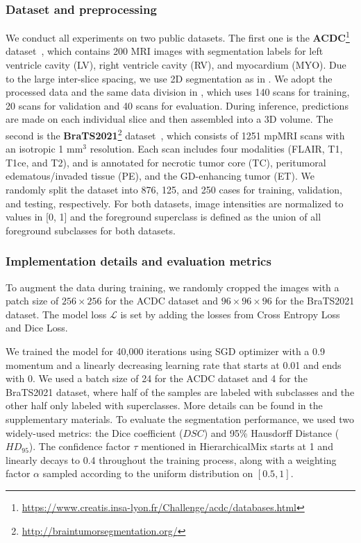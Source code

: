 \documentclass[runningheads]{llncs}
\begin{document}
\subsubsection{Dataset and preprocessing}
We conduct all experiments on two public datasets. The first one is the \textbf{ACDC}\footnote{\href{https://www.creatis.insa-lyon.fr/Challenge/acdc/databases.html}{https://www.creatis.insa-lyon.fr/Challenge/acdc/databases.html}} dataset~\cite{bernard2018deep}, which contains 200 MRI images with segmentation labels for left ventricle cavity (LV), right ventricle cavity (RV), and myocardium (MYO). Due to the large inter-slice spacing, we use 2D segmentation as in \cite{bai2017semi}. We adopt the processed data and the same data division in \cite{ssl4mis2020}, which uses 140 scans for training, 20 scans for validation and 40 scans for evaluation. During inference, predictions are made on each individual slice and then assembled into a 3D volume. The second is the \textbf{BraTS2021}\footnote{\href{http://braintumorsegmentation.org/}{http://braintumorsegmentation.org/}} dataset~\cite{baid2021rsna}, which consists of 1251 mpMRI scans with an isotropic 1 mm$^3$ resolution. Each scan includes four modalities (FLAIR, T1, T1ce, and T2), and is annotated for necrotic tumor core (TC), peritumoral edematous/invaded tissue (PE), and the GD-enhancing tumor (ET). We randomly split the dataset into 876, 125, and 250 cases for training, validation, and testing, respectively. For both datasets, image intensities are normalized to values in [0, 1] and the foreground superclass is defined as the union of all foreground subclasses for both datasets.

\subsubsection{Implementation details and evaluation metrics}
To augment the data during training, we randomly cropped the images with a patch size of $256 \times 256$ for the ACDC dataset and $96 \times 96 \times 96$ for the BraTS2021 dataset. The model loss $\mathcal{L}$ is set by adding the losses from Cross Entropy Loss and Dice Loss. %

We trained the model for 40,000 iterations using SGD optimizer with a 0.9 momentum and a linearly decreasing learning rate that starts at 0.01 and ends with 0. We used a batch size of 24 for the ACDC dataset and 4 for the BraTS2021 dataset, where half of the samples are labeled with subclasses and the other half only labeled with superclasses. More details can be found in the supplementary materials. To evaluate the segmentation performance, we used two widely-used metrics: the Dice coefficient ($DSC$) and 95\% Hausdorff Distance ($HD_{95}$). The confidence factor $\tau$ mentioned in HierarchicalMix starts at 1 and linearly decays to 0.4 throughout the training process, along with a weighting factor $\alpha$ sampled according to the uniform distribution on $[0.5, 1]$.
\end{document}
